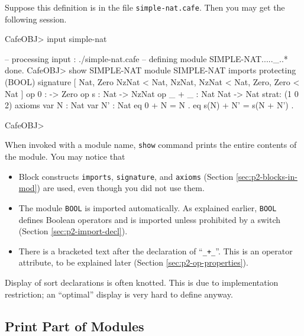 \documentclass[a4paper]{memoir}
\begin{document}
Suppose this definition is in the file \verb|simple-nat.cafe|. Then
you may get the following session.
\begin{vvtm}
\begin{ccode}
  CafeOBJ> input simple-nat

  -- processing input : ./simple-nat.cafe
  -- defining module SIMPLE-NAT....._..* done.
  CafeOBJ> show SIMPLE-NAT  
  module SIMPLE-NAT {
    imports {
      protecting (BOOL)
    }
    signature {
      [ Nat, Zero NzNat < Nat,
        NzNat, NzNat < Nat,
        Zero, Zero < Nat ]
      op 0 : -> Zero
      op s : Nat -> NzNat
      op _ + _ : Nat Nat -> Nat { strat: (1 0 2) }
    }
    axioms {
      var N : Nat
      var N' : Nat
      eq 0 + N = N .
      eq s(N) + N' = s(N + N') .
    }
  }

  CafeOBJ>
\end{ccode}
\end{vvtm}
When invoked with a module name, \verb|show| command prints the entire
contents of the module. You may notice that
\begin{itemize}
\item Block constructs \verb|imports|, \verb|signature|, and
  \verb|axioms| (Section \ref{sec:p2-blocks-in-mod}) are used,
  even though you did not use them.
\item The module \verb|BOOL| is imported automatically. As explained
  earlier, \verb|BOOL| defines Boolean operators and is imported unless
  prohibited by a switch (Section \ref{sec:p2-import-decl}).
\item There is a bracketed text after the declaration of ``\verb|_+_|''.
  This is an operator attribute, to be explained later
 (Section \ref{sec:p2-op-properties}).
\end{itemize}
\begin{warning}
  Display of sort declarations is often knotted. This is due to
  implementation restriction; an ``optimal'' display is very hard to
  define anyway.
\end{warning}

\subsection{Print Part of Modules}\label{sec:p2-print-part-of-module}
\end{document}
